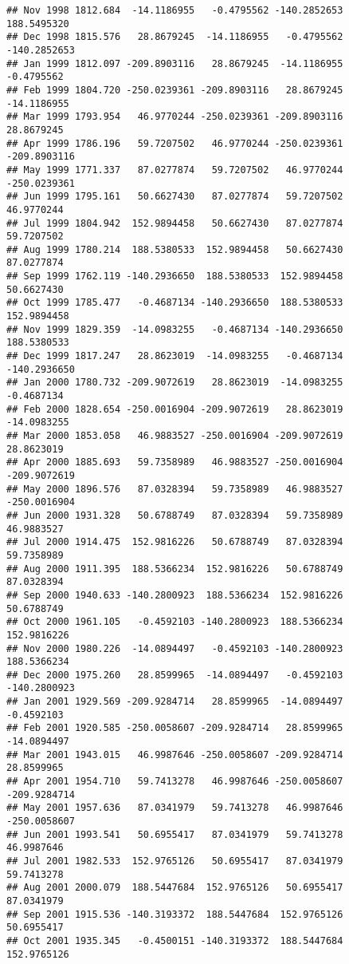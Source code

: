 \documentclass[]{article}
\begin{document}
\begin{verbatim}
## Nov 1998 1812.684  -14.1186955   -0.4795562 -140.2852653  188.5495320
## Dec 1998 1815.576   28.8679245  -14.1186955   -0.4795562 -140.2852653
## Jan 1999 1812.097 -209.8903116   28.8679245  -14.1186955   -0.4795562
## Feb 1999 1804.720 -250.0239361 -209.8903116   28.8679245  -14.1186955
## Mar 1999 1793.954   46.9770244 -250.0239361 -209.8903116   28.8679245
## Apr 1999 1786.196   59.7207502   46.9770244 -250.0239361 -209.8903116
## May 1999 1771.337   87.0277874   59.7207502   46.9770244 -250.0239361
## Jun 1999 1795.161   50.6627430   87.0277874   59.7207502   46.9770244
## Jul 1999 1804.942  152.9894458   50.6627430   87.0277874   59.7207502
## Aug 1999 1780.214  188.5380533  152.9894458   50.6627430   87.0277874
## Sep 1999 1762.119 -140.2936650  188.5380533  152.9894458   50.6627430
## Oct 1999 1785.477   -0.4687134 -140.2936650  188.5380533  152.9894458
## Nov 1999 1829.359  -14.0983255   -0.4687134 -140.2936650  188.5380533
## Dec 1999 1817.247   28.8623019  -14.0983255   -0.4687134 -140.2936650
## Jan 2000 1780.732 -209.9072619   28.8623019  -14.0983255   -0.4687134
## Feb 2000 1828.654 -250.0016904 -209.9072619   28.8623019  -14.0983255
## Mar 2000 1853.058   46.9883527 -250.0016904 -209.9072619   28.8623019
## Apr 2000 1885.693   59.7358989   46.9883527 -250.0016904 -209.9072619
## May 2000 1896.576   87.0328394   59.7358989   46.9883527 -250.0016904
## Jun 2000 1931.328   50.6788749   87.0328394   59.7358989   46.9883527
## Jul 2000 1914.475  152.9816226   50.6788749   87.0328394   59.7358989
## Aug 2000 1911.395  188.5366234  152.9816226   50.6788749   87.0328394
## Sep 2000 1940.633 -140.2800923  188.5366234  152.9816226   50.6788749
## Oct 2000 1961.105   -0.4592103 -140.2800923  188.5366234  152.9816226
## Nov 2000 1980.226  -14.0894497   -0.4592103 -140.2800923  188.5366234
## Dec 2000 1975.260   28.8599965  -14.0894497   -0.4592103 -140.2800923
## Jan 2001 1929.569 -209.9284714   28.8599965  -14.0894497   -0.4592103
## Feb 2001 1920.585 -250.0058607 -209.9284714   28.8599965  -14.0894497
## Mar 2001 1943.015   46.9987646 -250.0058607 -209.9284714   28.8599965
## Apr 2001 1954.710   59.7413278   46.9987646 -250.0058607 -209.9284714
## May 2001 1957.636   87.0341979   59.7413278   46.9987646 -250.0058607
## Jun 2001 1993.541   50.6955417   87.0341979   59.7413278   46.9987646
## Jul 2001 1982.533  152.9765126   50.6955417   87.0341979   59.7413278
## Aug 2001 2000.079  188.5447684  152.9765126   50.6955417   87.0341979
## Sep 2001 1915.536 -140.3193372  188.5447684  152.9765126   50.6955417
## Oct 2001 1935.345   -0.4500151 -140.3193372  188.5447684  152.9765126

\end{verbatim}
\end{document}
